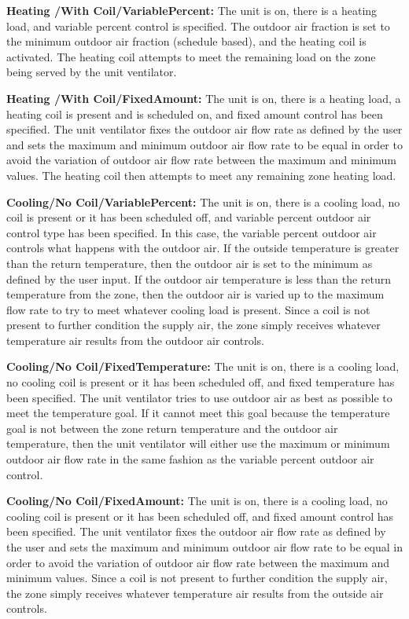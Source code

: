 \textbf{Heating /With Coil/VariablePercent:} The unit is on, there is a heating load, and variable percent control is specified. The outdoor air fraction is set to the minimum outdoor air fraction (schedule based), and the heating coil is activated. The heating coil attempts to meet the remaining load on the zone being served by the unit ventilator.

\textbf{Heating /With Coil/FixedAmount:} The unit is on, there is a heating load, a heating coil is present and is scheduled on, and fixed amount control has been specified. The unit ventilator fixes the outdoor air flow rate as defined by the user and sets the maximum and minimum outdoor air flow rate to be equal in order to avoid the variation of outdoor air flow rate between the maximum and minimum values. The heating coil then attempts to meet any remaining zone heating load.

\textbf{Cooling/No Coil/VariablePercent:} The unit is on, there is a cooling load, no coil is present or it has been scheduled off, and variable percent outdoor air control type has been specified. In this case, the variable percent outdoor air controls what happens with the outdoor air. If the outside temperature is greater than the return temperature, then the outdoor air is set to the minimum as defined by the user input. If the outdoor air temperature is less than the return temperature from the zone, then the outdoor air is varied up to the maximum flow rate to try to meet whatever cooling load is present. Since a coil is not present to further condition the supply air, the zone simply receives whatever temperature air results from the outdoor air controls.

\textbf{Cooling/No Coil/FixedTemperature:} The unit is on, there is a cooling load, no cooling coil is present or it has been scheduled off, and fixed temperature has been specified. The unit ventilator tries to use outdoor air as best as possible to meet the temperature goal. If it cannot meet this goal because the temperature goal is not between the zone return temperature and the outdoor air temperature, then the unit ventilator will either use the maximum or minimum outdoor air flow rate in the same fashion as the variable percent outdoor air control.

\textbf{Cooling/No Coil/FixedAmount:} The unit is on, there is a cooling load, no cooling coil is present or it has been scheduled off, and fixed amount control has been specified. The unit ventilator fixes the outdoor air flow rate as defined by the user and sets the maximum and minimum outdoor air flow rate to be equal in order to avoid the variation of outdoor air flow rate between the maximum and minimum values. Since a coil is not present to further condition the supply air, the zone simply receives whatever temperature air results from the outside air controls.

